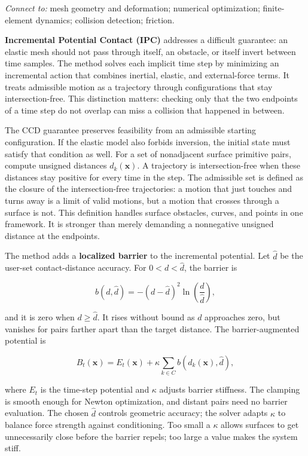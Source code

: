 \emph{Connect to:} mesh geometry and deformation; numerical optimization; finite-element dynamics; collision detection; friction.

\textbf{Incremental Potential Contact (IPC)} addresses a difficult guarantee: an elastic mesh should not pass through itself, an obstacle, or itself invert between time samples. The method solves each implicit time step by minimizing an incremental action that combines inertial, elastic, and external-force terms. It treats admissible motion as a trajectory through configurations that stay intersection-free. This distinction matters: checking only that the two endpoints of a time step do not overlap can miss a collision that happened in between.

The CCD guarantee preserves feasibility from an admissible starting configuration. If the elastic model also forbids inversion, the initial state must satisfy that condition as well. For a set of nonadjacent surface primitive pairs, compute unsigned distances \(d_k(\mathbf{x})\). A trajectory is intersection-free when these distances stay positive for every time in the step. The admissible set is defined as the closure of the intersection-free trajectories: a motion that just touches and turns away is a limit of valid motions, but a motion that crosses through a surface is not. This definition handles surface obstacles, curves, and points in one framework. It is stronger than merely demanding a nonnegative unsigned distance at the endpoints.

The method adds a \textbf{localized barrier} to the incremental potential. Let \(\widehat d\) be the user-set contact-distance accuracy. For \(0<d<\widehat d\), the barrier is

\[b(d,\widehat d)=-(d-\widehat d)^2\ln\left(\frac{d}{\widehat d}\right),\]

and it is zero when \(d\ge\widehat d\). It rises without bound as \(d\) approaches zero, but vanishes for pairs farther apart than the target distance. The barrier-augmented potential is

\[B_t(\mathbf{x})=E_t(\mathbf{x})+\kappa\sum_{k\in C}b(d_k(\mathbf{x}),\widehat d),\]

where \(E_t\) is the time-step potential and \(\kappa\) adjusts barrier stiffness. The clamping is smooth enough for Newton optimization, and distant pairs need no barrier evaluation. The chosen \(\widehat d\) controls geometric accuracy; the solver adapts \(\kappa\) to balance force strength against conditioning. Too small a \(\kappa\) allows surfaces to get unnecessarily close before the barrier repels; too large a value makes the system stiff.

